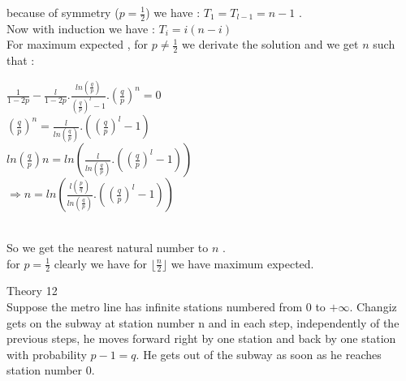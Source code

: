 \documentclass[30pt]{article}
\begin{document}
because of symmetry ($p = \frac{1}{2}$) we have : $T_1 = T_{l-1} = n-1 $ . \\
Now with induction we have : \hspace{0.5cm} $T_i = i(n-i) $ \\ \newline
For maximum expected ,  for $p \neq \frac{1}{2} $ we derivate the solution and we get $n$ such that : \\
\begin{center}
    $ \frac{1}{1-2p} - \frac{l}{1-2p} . \frac{ln(\frac{q}{p})}{(\frac{q}{p})^l -1}.(\frac{q}{p})^n = 0 $ \vspace{0.2cm} \\
    $(\frac{q}{p})^n = \frac{l}{ln(\frac{q}{p})}.((\frac{q}{p})^l -1)  $  \vspace{0.2cm} \\ 
    $ln(\frac{q}{p}) n = ln(\frac{l}{ln(\frac{q}{p})}.((\frac{q}{p})^l -1)) $ \vspace{0.2cm} \\  
    $\Rightarrow n = ln(\frac{l(\frac{p}{q})}{ln(\frac{q}{p})}.((\frac{q}{p})^l -1)) $
\end{center} \\
So we get the nearest natural number to $n$ . \\ 
for $p = \frac{1}{2} $ clearly we have for $\lfloor \frac{n}{2} \rfloor $ we have maximum expected. \\ \newline 

{\Large \color{blue} Theory 12 } \\
{\color{blue} Suppose the metro line has infinite stations numbered from $0$ to $+ \infty$. Changiz gets on the subway at station number n and in each step, independently of the previous steps, he moves forward right by one station and back by one station with probability $p − 1 = q$. He gets out of the subway as soon as he reaches station number 0. } \\ \newline 
\end{document}
